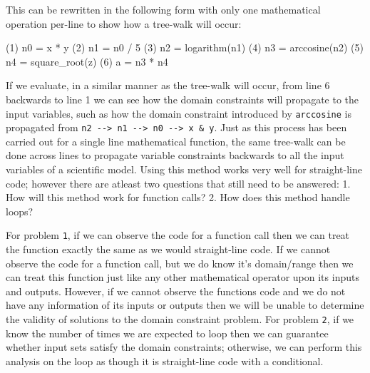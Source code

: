 \documentclass[article, 12pt, oneside]{memoir}
\newenvironment{Shaded}{}{}
\newcommand{\DecValTok}[1]{\textcolor[rgb]{0.25,0.63,0.44}{#1}}
\newcommand{\NormalTok}[1]{#1}
\newcommand{\OperatorTok}[1]{\textcolor[rgb]{0.40,0.40,0.40}{#1}}
\begin{document}
This can be rewritten in the following form with only one mathematical
operation per-line to show how a tree-walk will occur:

\begin{Shaded}
\begin{Highlighting}[]
\NormalTok{(}\DecValTok{1}\NormalTok{) n0 }\OperatorTok{=}\NormalTok{ x }\OperatorTok{*}\NormalTok{ y}
\NormalTok{(}\DecValTok{2}\NormalTok{) n1 }\OperatorTok{=}\NormalTok{ n0 }\OperatorTok{/} \DecValTok{5}
\NormalTok{(}\DecValTok{3}\NormalTok{) n2 }\OperatorTok{=}\NormalTok{ logarithm(n1)}
\NormalTok{(}\DecValTok{4}\NormalTok{) n3 }\OperatorTok{=}\NormalTok{ arccosine(n2)}
\NormalTok{(}\DecValTok{5}\NormalTok{) n4 }\OperatorTok{=}\NormalTok{ square_root(z)}
\NormalTok{(}\DecValTok{6}\NormalTok{) a }\OperatorTok{=}\NormalTok{ n3 }\OperatorTok{*}\NormalTok{ n4}
\end{Highlighting}
\end{Shaded}

If we evaluate, in a similar manner as the tree-walk will occur, from
line 6 backwards to line 1 we can see how the domain constraints will
propagate to the input variables, such as how the domain constraint
introduced by \texttt{arccosine} is propagated from
\texttt{n2\ -\/-\textgreater{}\ n1\ -\/-\textgreater{}\ n0\ -\/-\textgreater{}\ x\ \&\ y}.
Just as this process has been carried out for a single line mathematical
function, the same tree-walk can be done across lines to propagate
variable constraints backwards to all the input variables of a
scientific model. Using this method works very well for straight-line
code; however there are atleast two questions that still need to be
answered: 1. How will this method work for function calls? 2. How does
this method handle loops?

For problem \texttt{1}, if we can observe the code for a function call
then we can treat the function exactly the same as we would
straight-line code. If we cannot observe the code for a function call,
but we do know it's domain/range then we can treat this function just
like any other mathematical operator upon its inputs and outputs.
However, if we cannot observe the functions code and we do not have any
information of its inputs or outputs then we will be unable to determine
the validity of solutions to the domain constraint problem. For problem
\texttt{2}, if we know the number of times we are expected to loop then
we can guarantee whether input sets satisfy the domain constraints;
otherwise, we can perform this analysis on the loop as though it is
straight-line code with a conditional.
\end{document}
